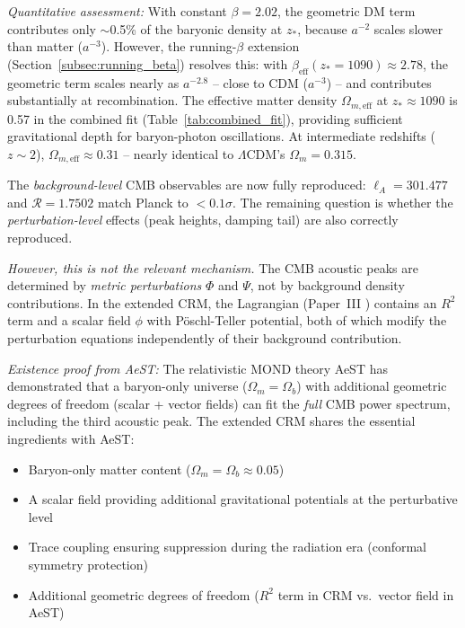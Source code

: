 \documentclass[aps,prd,twocolumn,superscriptaddress,nofootinbib,floatfix]{revtex4-2}
\begin{document}
\textit{Quantitative assessment:} With constant $\beta = 2.02$, the geometric DM term contributes only $\sim$0.5\% of the baryonic density at $z_*$, because $a^{-2}$ scales slower than matter ($a^{-3}$). However, the running-$\beta$ extension (Section~\ref{subsec:running_beta}) resolves this: with $\beta_{\mathrm{eff}}(z_* = 1090) \approx 2.78$, the geometric term scales nearly as $a^{-2.8}$ -- close to CDM ($a^{-3}$) -- and contributes substantially at recombination. The effective matter density $\Omega_{m,\mathrm{eff}}$ at $z_* \approx 1090$ is 0.57 in the combined fit (Table~\ref{tab:combined_fit}), providing sufficient gravitational depth for baryon-photon oscillations. At intermediate redshifts ($z \sim 2$), $\Omega_{m,\mathrm{eff}} \approx 0.31$ -- nearly identical to $\Lambda$CDM's $\Omega_m = 0.315$.

The \textit{background-level} CMB observables are now fully reproduced: $\ell_A = 301.477$ and $\mathcal{R} = 1.7502$ match Planck to $<0.1\sigma$. The remaining question is whether the \textit{perturbation-level} effects (peak heights, damping tail) are also correctly reproduced.

\textit{However, this is not the relevant mechanism.} The CMB acoustic peaks are determined by \textit{metric perturbations} $\Phi$ and $\Psi$, not by background density contributions. In the extended CRM, the Lagrangian (Paper~III \cite{Geiger2026c}) contains an $R^2$ term and a scalar field $\phi$ with P\"oschl-Teller potential, both of which modify the perturbation equations independently of their background contribution.

\textit{Existence proof from AeST:} The relativistic MOND theory AeST \cite{Skordis2021} has demonstrated that a baryon-only universe ($\Omega_m = \Omega_b$) with additional geometric degrees of freedom (scalar + vector fields) can fit the \textit{full} CMB power spectrum, including the third acoustic peak. The extended CRM shares the essential ingredients with AeST:
\begin{itemize}
\item Baryon-only matter content ($\Omega_m = \Omega_b \approx 0.05$)
\item A scalar field providing additional gravitational potentials at the perturbative level
\item Trace coupling ensuring suppression during the radiation era (conformal symmetry protection)
\item Additional geometric degrees of freedom ($R^2$ term in CRM vs.\ vector field in AeST)
\end{itemize}
\end{document}
